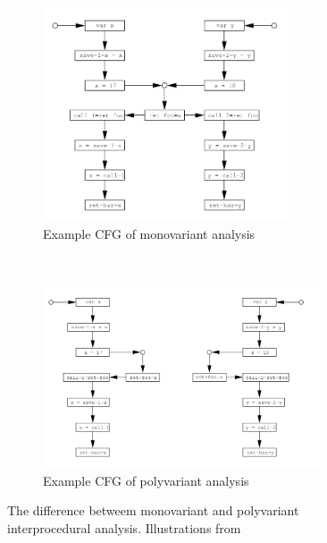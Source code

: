 \begin{figure}[H]

  \begin{subfigure}[b]{\textwidth}
    \centering
    \includegraphics[width=0.8\textwidth]{figures/monovariant}
    \caption{Example CFG of monovariant analysis}
    \label{monovariant}
  \end{subfigure}
 ~ 
  \begin{subfigure}[b]{\textwidth}
    \centering
    \includegraphics[width=0.9\textwidth]{figures/polyvariant}
    \caption{Example CFG of polyvariant analysis}
    \label{polyvariant}
  \end{subfigure}
  
  \caption{The difference betweem monovariant and polyvariant interprocedural analysis. Illustrations from \citet[p.~40]{schwartzbach}}
  \label{monopoly}
\end{figure}

